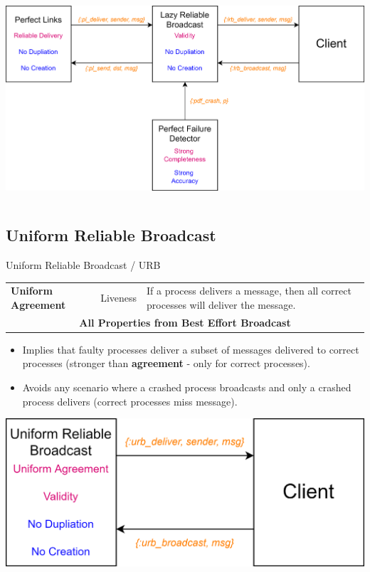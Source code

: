 \begin{center}
  \includegraphics[width=.8\textwidth]{broadcast/images/lazy_reliable_broadcast.drawio.png}
\end{center}

\inputminted{elixir}{broadcast/code/lazy_reliable_broadcast.ex}

\subsection{Uniform Reliable Broadcast}
\begin{definitionbox}{Uniform Reliable Broadcast / URB}
    \begin{center}
        \begin{tabular}{l l p{}}
            \textbf{Uniform Agreement} & Liveness & If a process delivers a message, then all correct processes will deliver the message. \\
            \multicolumn{3}{c}{\textbf{All Properties from Best Effort Broadcast}} \\
        \end{tabular}
    \end{center}
    \begin{itemize}
        \item Implies that faulty processes deliver a subset of messages delivered to correct processes (stronger than \textbf{agreement} - only for correct processes).
        \item Avoids any scenario where a crashed process broadcasts and only a crashed process delivers (correct processes miss message).
    \end{itemize}
\end{definitionbox}
\begin{center}
    \includegraphics[width=.5\textwidth]{broadcast/images/uniform_reliable_broadcast.drawio.png}
\end{center}


